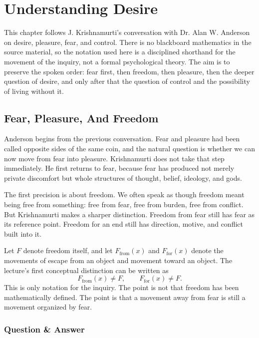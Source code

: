 \chapter{Understanding Desire}

This chapter follows J. Krishnamurti's conversation with Dr. Alan W. Anderson on desire, pleasure, fear, and control. There is no blackboard mathematics in the source material, so the notation used here is a disciplined shorthand for the movement of the inquiry, not a formal psychological theory. The aim is to preserve the spoken order: fear first, then freedom, then pleasure, then the deeper question of desire, and only after that the question of control and the possibility of living without it.

\section{Fear, Pleasure, And Freedom}

Anderson begins from the previous conversation. Fear and pleasure had been called opposite sides of the same coin, and the natural question is whether we can now move from fear into pleasure. Krishnamurti does not take that step immediately. He first returns to fear, because fear has produced not merely private discomfort but whole structures of thought, belief, ideology, and gods.

The first precision is about freedom. We often speak as though freedom meant being free from something: free from fear, free from burden, free from conflict. But Krishnamurti makes a sharper distinction. Freedom from fear still has fear as its reference point. Freedom for an end still has direction, motive, and conflict built into it.

Let \(F\) denote freedom itself, and let \(F_{\mathrm{from}}(x)\) and \(F_{\mathrm{for}}(x)\) denote the movements of escape from an object and movement toward an object. The lecture's first conceptual distinction can be written as
\begin{equation}
F_{\mathrm{from}}(x) \neq F,
\qquad
F_{\mathrm{for}}(x) \neq F.
\end{equation}
This is only notation for the inquiry. The point is not that freedom has been mathematically defined. The point is that a movement away from fear is still a movement organized by fear.

\subsection{Question \& Answer}

